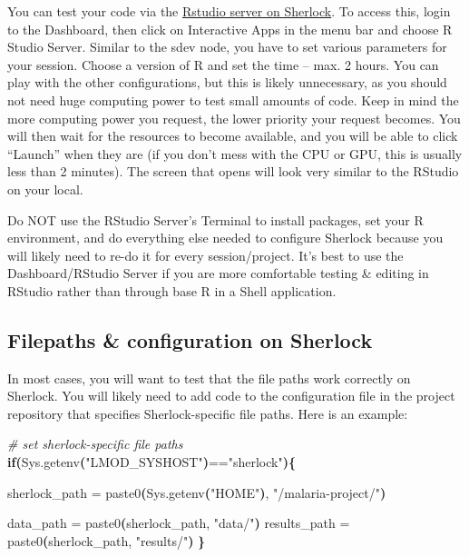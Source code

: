 \documentclass[
]{book}
\newenvironment{Shaded}{\begin{snugshade}}{\end{snugshade}}
\newcommand{\CommentTok}[1]{\textcolor[rgb]{0.56,0.35,0.01}{\textit{#1}}}
\newcommand{\ControlFlowTok}[1]{\textcolor[rgb]{0.13,0.29,0.53}{\textbf{#1}}}
\newcommand{\ErrorTok}[1]{\textcolor[rgb]{0.64,0.00,0.00}{\textbf{#1}}}
\newcommand{\ExtensionTok}[1]{#1}
\newcommand{\KeywordTok}[1]{\textcolor[rgb]{0.13,0.29,0.53}{\textbf{#1}}}
\newcommand{\NormalTok}[1]{#1}
\newcommand{\StringTok}[1]{\textcolor[rgb]{0.31,0.60,0.02}{#1}}
\begin{document}
You can test your code via the \href{https://www.sherlock.stanford.edu/docs/user-guide/ondemand/\#rstudio}{Rstudio server on Sherlock}. To access this, login to the Dashboard, then click on Interactive Apps in the menu bar and choose R Studio Server. Similar to the sdev node, you have to set various parameters for your session. Choose a version of R and set the time -- max. 2 hours. You can play with the other configurations, but this is likely unnecessary, as you should not need huge computing power to test small amounts of code. Keep in mind the more computing power you request, the lower priority your request becomes. You will then wait for the resources to become available, and you will be able to click ``Launch'' when they are (if you don't mess with the CPU or GPU, this is usually less than 2 minutes). The screen that opens will look very similar to the RStudio on your local.

Do NOT use the RStudio Server's Terminal to install packages, set your R environment, and do everything else needed to configure Sherlock because you will likely need to re-do it for every session/project. It's best to use the Dashboard/RStudio Server if you are more comfortable testing \& editing in RStudio rather than through base R in a Shell application.

\subsection{Filepaths \& configuration on Sherlock}\label{filepaths-configuration-on-sherlock}

In most cases, you will want to test that the file paths work correctly on Sherlock. You will likely need to add code to the configuration file in the project repository that specifies Sherlock-specific file paths. Here is an example:

\begin{Shaded}
\begin{Highlighting}[]
\CommentTok{\# set sherlock{-}specific file paths}
\ControlFlowTok{if}\KeywordTok{(}\ExtensionTok{Sys.getenv}\ErrorTok{(}\StringTok{"LMOD\_SYSHOST"}\KeywordTok{)}\ExtensionTok{==}\StringTok{"sherlock"}\KeywordTok{)\{}
  
  \ExtensionTok{sherlock\_path}\NormalTok{ = paste0}\ErrorTok{(}\ExtensionTok{Sys.getenv}\ErrorTok{(}\StringTok{"HOME"}\KeywordTok{)}\ExtensionTok{,} \StringTok{"/malaria{-}project/"}\KeywordTok{)}
  
  \ExtensionTok{data\_path}\NormalTok{ = paste0}\ErrorTok{(}\ExtensionTok{sherlock\_path,} \StringTok{"data/"}\KeywordTok{)}
  \ExtensionTok{results\_path}\NormalTok{ = paste0}\ErrorTok{(}\ExtensionTok{sherlock\_path,} \StringTok{"results/"}\KeywordTok{)}
\KeywordTok{\}}
\end{Highlighting}
\end{Shaded}
\end{document}
